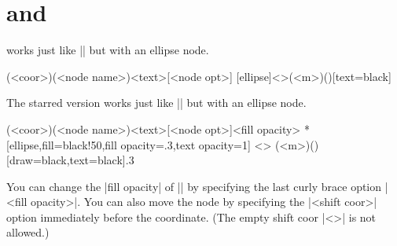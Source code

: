 \section{\protect\cmd{\tznodeellipse} and \protect\cmd{\tznodeellipse*}}
\label{s:tznodeellipse}

\icmd{\tznodeellipse} works just like |\tznodeframe| but with an ellipse node.

\begin{tzdef}{}
(<coor>)(<node name>){<text>}[<node opt>]
  [ellipse]<>(<m>)(){}[text=black]
\end{tzdef}

The starred version \icmd{\tznodeellipse*} works just like |\tznodeframe*| but with an ellipse node.

\begin{tzdef}{}
               (<coor>)(<node name>){<text>}[<node opt>]{<fill opacity>}
 *[ellipse,fill=black!50,fill opacity=.3,text opacity=1] <>
  (<m>)(){}[draw=black,text=black]{.3}
\end{tzdef}

\begin{tzcode}{.3}
{}
\end{tzcode}

You can change the |fill opacity| of |\tznodeellipse*| by specifying the last curly brace option |{<fill opacity>}|. You can also move the node by specifying the |<shift coor>| option immediately before the coordinate.
(The empty shift coor |<>| is not allowed.)

\begin{tzcode}{.3}
\end{tzcode}


